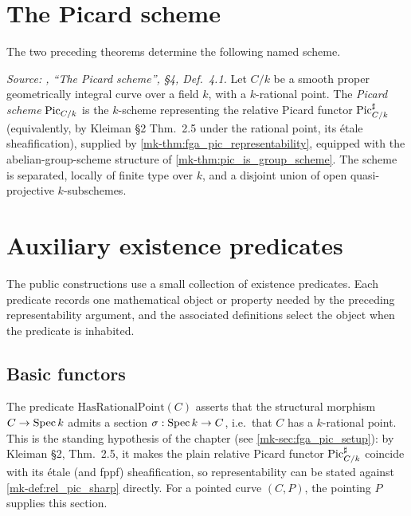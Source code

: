 \section{The Picard scheme}
\label{mk-sec:fga_pic_named_definition}

The two preceding theorems determine the following named scheme.

\begin{definition}\label{mk-def:pic_scheme}
  \leanok

  \textit{Source: \cite{kleiman-picard}, ``The Picard scheme'', \S 4, Def.~4.1.}
  Let \(C/k\) be a smooth proper geometrically integral curve over a field
  \(k\), with a \(k\)-rational point. The \emph{Picard scheme} \(\operatorname{Pic}_{C/k}\)
  is the \(k\)-scheme representing the relative Picard functor
  \(\operatorname{Pic}^\sharp_{C/k}\) (equivalently, by Kleiman \S 2 Thm.~2.5 under the
  rational point, its \'etale sheafification), supplied by
  \ref{mk-thm:fga_pic_representability}, equipped with the abelian-group-scheme
  structure of \ref{mk-thm:pic_is_group_scheme}. The scheme is separated,
  locally of finite type over \(k\), and a disjoint union of open
  quasi-projective \(k\)-subschemes.
\end{definition}

\section{Auxiliary existence predicates}
\label{mk-sec:fga_pic_typeclass_scaffolding}

The public constructions use a small collection of existence predicates. Each
predicate records one mathematical object or property needed by the preceding
representability argument, and the associated definitions select the object
when the predicate is inhabited.

\subsection{Basic functors}
\label{mk-subsec:fga_pic_functor_carriers}

\begin{definition}\label{mk-def:has_rational_point}
  \leanok

  The predicate \(\mathrm{HasRationalPoint}(C)\) asserts that the structural
  morphism \(C \to \operatorname{Spec} k\) admits a section
  \(\sigma : \operatorname{Spec} k \to C\), i.e.\ that \(C\) has a \(k\)-rational point.
  This is the standing hypothesis of the chapter (see
  \ref{mk-sec:fga_pic_setup}): by Kleiman \S 2, Thm.~2.5, it makes the plain
  relative Picard functor \(\operatorname{Pic}^\sharp_{C/k}\) coincide with its \'etale
  (and fppf) sheafification, so representability can be stated against
  \ref{mk-def:rel_pic_sharp} directly. For a pointed curve \((C,P)\), the
  pointing \(P\) supplies this section.
\end{definition}

